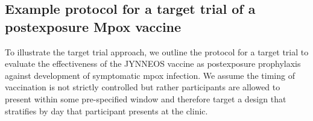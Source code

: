 \documentclass[11pt]{article}
\begin{document}



\subsection{Example protocol for a target trial of a postexposure Mpox vaccine}

To illustrate the target trial approach, we outline the protocol for a target trial to evaluate the effectiveness of the JYNNEOS vaccine as postexposure prophylaxis against development of symptomatic mpox infection. We assume the timing of vaccination is not strictly controlled but rather participants are allowed to present within some pre-specified window and therefore target a design that stratifies by day that participant presents at the clinic.
\end{document}
